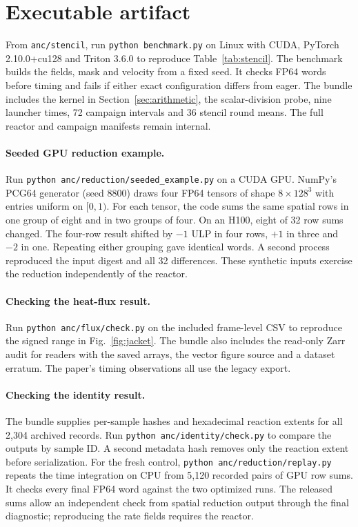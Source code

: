 \documentclass{article}
\newcommand{\code}[1]{\texttt{#1}}
\begin{document}
\clearpage
\section{Executable artifact}
From \code{anc/stencil}, run \code{python benchmark.py} on Linux with CUDA, PyTorch 2.10.0+cu128 and Triton 3.6.0 to reproduce Table~\ref{tab:stencil}. The benchmark builds the fields, mask and velocity from a fixed seed. It checks FP64 words before timing and fails if either exact configuration differs from eager. The bundle includes the kernel in Section~\ref{sec:arithmetic}, the scalar-division probe, nine launcher times, 72 campaign intervals and 36 stencil round means. The full reactor and campaign manifests remain internal.

\paragraph{Seeded GPU reduction example.}
Run \code{python anc/reduction/seeded\_example.py} on a CUDA GPU. NumPy's PCG64 generator (seed 8800) draws four FP64 tensors of shape $8\times128^3$ with entries uniform on $[0,1)$. For each tensor, the code sums the same spatial rows in one group of eight and in two groups of four. On an H100, eight of 32 row sums changed. The four-row result shifted by $-1$ ULP in four rows, $+1$ in three and $-2$ in one. Repeating either grouping gave identical words. A second process reproduced the input digest and all 32 differences. These synthetic inputs exercise the reduction independently of the reactor.

\paragraph{Checking the heat-flux result.}
Run \code{python anc/flux/check.py} on the included frame-level CSV to reproduce the signed range in Fig.~\ref{fig:jacket}. The bundle also includes the read-only Zarr audit for readers with the saved arrays, the vector figure source and a dataset erratum. The paper's timing observations all use the legacy export.

\paragraph{Checking the identity result.}
The bundle supplies per-sample hashes and hexadecimal reaction extents for all 2,304 archived records. Run \code{python anc/identity/check.py} to compare the outputs by sample ID. A second metadata hash removes only the reaction extent before serialization. For the fresh control, \code{python anc/reduction/replay.py} repeats the time integration on CPU from 5,120 recorded pairs of GPU row sums. It checks every final FP64 word against the two optimized runs. The released sums allow an independent check from spatial reduction output through the final diagnostic; reproducing the rate fields requires the reactor.
\end{document}
